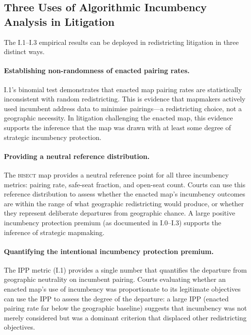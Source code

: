 \subsection{Three Uses of Algorithmic Incumbency Analysis in Litigation}

The I.1--I.3 empirical results can be deployed in redistricting litigation in three
distinct ways.

\paragraph{Establishing non-randomness of enacted pairing rates.}
I.1's binomial test demonstrates that enacted map pairing rates are statistically
inconsistent with random redistricting. This is evidence that mapmakers actively used
incumbent address data to minimise pairings---a redistricting choice, not a geographic
necessity. In litigation challenging the enacted map, this evidence supports the
inference that the map was drawn with at least some degree of strategic incumbency
protection.

\paragraph{Providing a neutral reference distribution.}
The \textsc{bisect} map provides a neutral reference point for all three incumbency
metrics: pairing rate, safe-seat fraction, and open-seat count. Courts can use this
reference distribution to assess whether the enacted map's incumbency outcomes are
within the range of what geographic redistricting would produce, or whether they
represent deliberate departures from geographic chance. A large positive incumbency
protection premium (as documented in I.0--I.3) supports the inference of strategic
mapmaking.

\paragraph{Quantifying the intentional incumbency protection premium.}
The IPP metric (I.1) provides a single number that quantifies the departure from
geographic neutrality on incumbent pairing. Courts evaluating whether an enacted map's
use of incumbency was proportionate to its legitimate objectives can use the IPP to
assess the degree of the departure: a large IPP (enacted pairing rate far below the
geographic baseline) suggests that incumbency was not merely considered but was a
dominant criterion that displaced other redistricting objectives.

